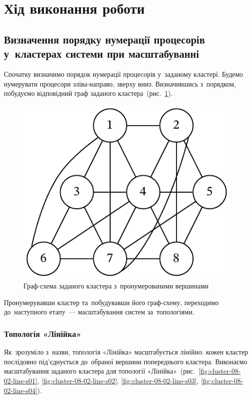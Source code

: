 \documentclass[
	a4paper,
	oneside,
	BCOR = 10mm,
	DIV = 12,
	12pt,
	headings = normal,
]{scrartcl}
\begin{document}
	\section{Хід виконання роботи}
		\subsection{Визначення порядку нумерації процесорів у~кластерах системи при масштабуванні}
		\label{ssec:scaling}
			Спочатку визначимо порядок нумерації процесорів у~заданому кластері. Будемо нумерувати процесори зліва-направо, зверху вниз. Визначившись з~порядком, побудуємо відповідний граф заданого кластера~(рис.~\ref{fig:cluster-08-01-named}).

			\begin{figure}[!htbp]
				\centering
				\includegraphics[height=6\baselineskip]{./assets/cluster-08-01-named.pdf}
				\caption{Граф-схема заданого кластера з~пронумерованими вершинами}
				\label{fig:cluster-08-01-named}
			\end{figure}

			Пронумерувавши кластер та~побудувавши його граф-схему, переходимо до~наступного етапу~— масштабування систем за~топологіями.

			\subsubsection{Топологія «Лінійка»}
				Як~зрозуміло з~назви, топологія «Лінійка» масштабується лінійно: кожен кластер послідовно під'єднується до~обраної вершини попереднього кластера. Виконаємо масштабування заданого кластера для топології «Лінійка»~(рис.~\ref{fig:cluster-08-02-line-s01}, \ref{fig:cluster-08-02-line-s02}, \ref{fig:cluster-08-02-line-s03}, \ref{fig:cluster-08-02-line-s04}).
\end{document}
